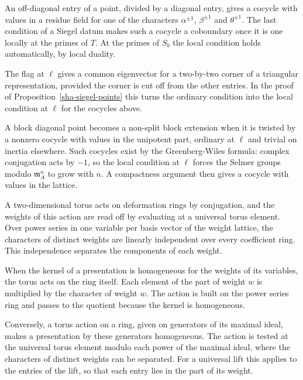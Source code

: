 An off-diagonal entry of a point, divided by a diagonal entry, gives a cocycle with values in a residue field for one of the characters $\alpha^{\pm1}$, $\beta^{\pm1}$ and $\theta^{\pm1}$. The last condition of a Siegel datum makes such a cocycle a coboundary once it is one locally at the primes of $T$. At the primes of $S_b$ the local condition holds automatically, by local duality.

The flag at $\ell$ gives a common eigenvector for a two-by-two corner of a triangular representation, provided the corner is cut off from the other entries. In the proof of Proposition~\ref{sha-siegel-points} this turns the ordinary condition into the local condition at $\ell$ for the cocycles above.

A block diagonal point becomes a non-split block extension when it is twisted by a nonzero cocycle with values in the unipotent part, ordinary at $\ell$ and trivial on inertia elsewhere. Such cocycles exist by the Greenberg-Wiles formula: complex conjugation acts by $-1$, so the local condition at $\ell$ forces the Selmer groups modulo $\mathfrak m_A^n$ to grow with $n$. A compactness argument then gives a cocycle with values in the lattice.

A two-dimensional torus acts on deformation rings by conjugation, and the weights of this action are read off by evaluating at a universal torus element. Over power series in one variable per basis vector of the weight lattice, the characters of distinct weights are linearly independent over every coefficient ring. This independence separates the components of each weight.

When the kernel of a presentation is homogeneous for the weights of its variables, the torus acts on the ring itself. Each element of the part of weight $w$ is multiplied by the character of weight $w$. The action is built on the power series ring and passes to the quotient because the kernel is homogeneous.

Conversely, a torus action on a ring, given on generators of its maximal ideal, makes a presentation by these generators homogeneous. The action is tested at the universal torus element modulo each power of the maximal ideal, where the characters of distinct weights can be separated. For a universal lift this applies to the entries of the lift, so that each entry lies in the part of its weight.

